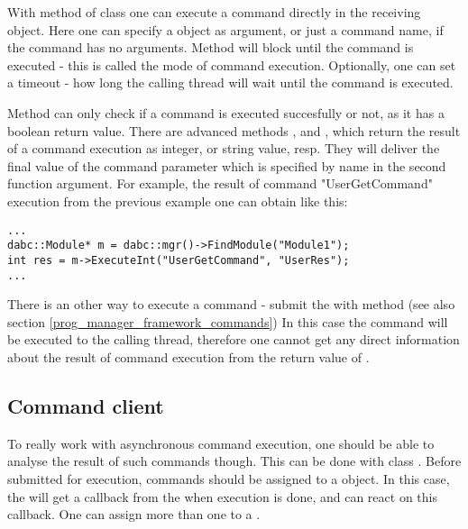 With method  of class  one can execute 
a command directly in the receiving object. 
Here one can specify a  object as argument,
or just a command name, if the command has no arguments. 
Method  will block
until the command is executed - this is called the   
mode of command execution. Optionally, one can set a timeout - how long the calling thread will wait until the command is executed. 

Method  can only check if a command is executed succesfully or not,
as it has a boolean return value. There are advanced methods , and
, which return the result of a command execution as integer, or string value, resp. They will deliver the final value of the command parameter which is specified
by name in the second function argument.
For example, the result of command "UserGetCommand" execution from the previous 
example one can obtain like this:  

\begin{small}
\begin{verbatim}
...
dabc::Module* m = dabc::mgr()->FindModule("Module1");
int res = m->ExecuteInt("UserGetCommand", "UserRes");
...
\end{verbatim}     
\end{small}


There is an other way to execute a command - submit 
the  with  method
(see also  section \ref{prog_manager_framework_commands})
In this case the command will be executed  to the calling thread, therefore one cannot get any direct information about the result of command execution
from the return value of .


\subsection{Command client}

To really work with asynchronous command execution, one should be able to analyse the 
result of such commands though. This can be done with class .
Before submitted for execution, commands should be assigned 
to a  object.
In this case, the 
will get a callback from the  when execution is done,
and can react on this callback.
One can assign more than one  to a  .

